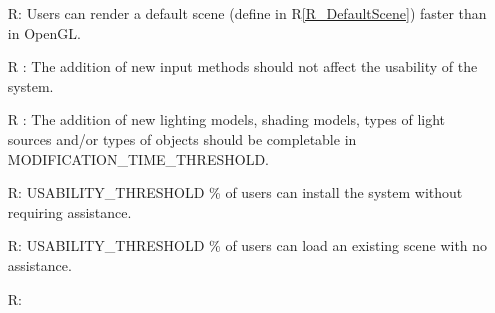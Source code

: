 \documentclass[12pt, titlepage]{article}
\newcounter{reqnum} %
\newcommand{\rref}[1]{R\ref{#1}}
\begin{document}
\begin{itemize}
	\item[R\refstepcounter{reqnum}\thereqnum \label{R_Performance}:]Users can 
	render a default scene (define in \rref{R_DefaultScene}) faster than in 
	OpenGL.
	\item[R\refstepcounter{reqnum}\thereqnum 
	\label{NFR-Productivity-InputMods}:] 
	The addition of new input methods should not affect the usability of the 
	system.
	\item[R\refstepcounter{reqnum}\thereqnum 
	\label{NFR-Productivity-Modifications}:] 
	The addition of new lighting models, shading models, types of light sources 
	and/or types of objects should be completable in 
	MODIFICATION\_TIME\_THRESHOLD.
	\item[R\refstepcounter{reqnum}\thereqnum \label{NFR-Usability-Install}:] 
	USABILITY\_THRESHOLD \% of users can install the system without requiring 
	assistance.
	\item[R\refstepcounter{reqnum}\thereqnum \label{NFR-Usability-load}:] 
	USABILITY\_THRESHOLD \% of users can load an existing scene with no 
	assistance.
	\item[R\refstepcounter{reqnum}\thereqnum \label{NFR-Usability-changes}:] 

\end{itemize}
\end{document}
